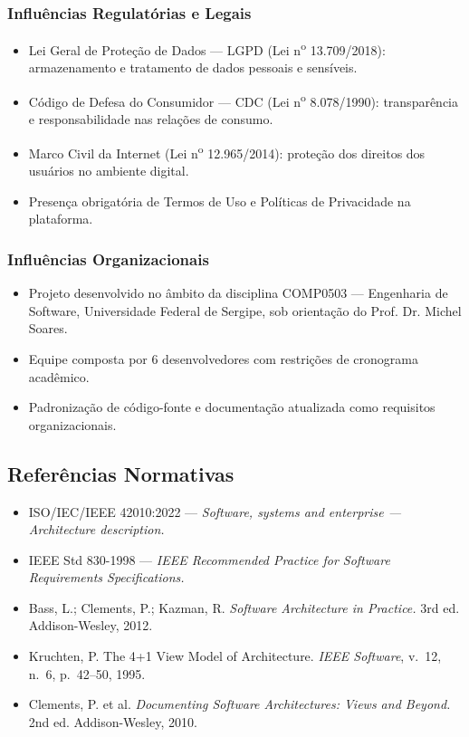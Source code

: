 \documentclass[12pt, a4paper]{article}
\begin{document}
\subsubsection{Influências Regulatórias e Legais}
\begin{itemize}[noitemsep]
    \item Lei Geral de Proteção de Dados --- LGPD (Lei n\textsuperscript{o} 13.709/2018): armazenamento e tratamento de dados pessoais e sensíveis.
    \item Código de Defesa do Consumidor --- CDC (Lei n\textsuperscript{o} 8.078/1990): transparência e responsabilidade nas relações de consumo.
    \item Marco Civil da Internet (Lei n\textsuperscript{o} 12.965/2014): proteção dos direitos dos usuários no ambiente digital.
    \item Presença obrigatória de Termos de Uso e Políticas de Privacidade na plataforma.
\end{itemize}

\subsubsection{Influências Organizacionais}
\begin{itemize}[noitemsep]
    \item Projeto desenvolvido no âmbito da disciplina COMP0503 --- Engenharia de Software, Universidade Federal de Sergipe, sob orientação do Prof. Dr. Michel Soares.
    \item Equipe composta por 6 desenvolvedores com restrições de cronograma acadêmico.
    \item Padronização de código-fonte e documentação atualizada como requisitos organizacionais.
\end{itemize}

\subsection{Referências Normativas}

\begin{itemize}[noitemsep]
    \item ISO/IEC/IEEE 42010:2022 --- \textit{Software, systems and enterprise --- Architecture description.}
    \item IEEE Std 830-1998 --- \textit{IEEE Recommended Practice for Software Requirements Specifications.}
    \item Bass, L.; Clements, P.; Kazman, R. \textit{Software Architecture in Practice.} 3rd ed. Addison-Wesley, 2012.
    \item Kruchten, P. The 4+1 View Model of Architecture. \textit{IEEE Software}, v.~12, n.~6, p.~42--50, 1995.
    \item Clements, P. et al. \textit{Documenting Software Architectures: Views and Beyond.} 2nd ed. Addison-Wesley, 2010.
\end{itemize}
\end{document}
